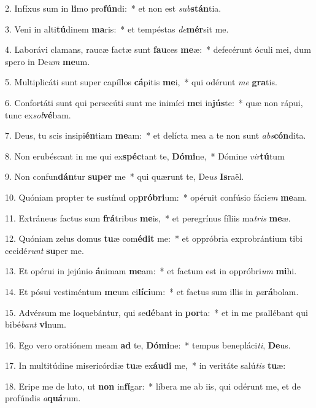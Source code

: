 2. Infíxus sum in \textbf{li}mo pro\textbf{fún}di:~*  et non est \textit{sub}\textbf{stán}tia.\

3. Veni in alti\textbf{tú}dinem \textbf{ma}ris:~*  et tempéstas \textit{de}\textbf{mér}sit me.\

4. Laborávi clamans, raucæ factæ sunt \textbf{fau}ces \textbf{me}æ:~*  defecérunt óculi mei, dum spero in De\textit{um} \textbf{me}um.\

5. Multiplicáti sunt super capíllos \textbf{cá}pitis \textbf{me}i,~*  qui odérunt \textit{me} \textbf{gra}tis.\

6. Confortáti sunt qui persecúti sunt me inimíci \textbf{me}i in\textbf{jús}te:~*  quæ non rápui, tunc ex\textit{sol}\textbf{vé}bam.\

7. Deus, tu scis insipi\textbf{én}tiam \textbf{me}am:~*  et delícta mea a te non sunt \textit{abs}\textbf{cón}dita.\

8. Non erubéscant in me qui ex\textbf{spéc}tant te, \textbf{Dó}\textbf{mi}ne,~*  Dómine \textit{vir}\textbf{tú}tum\

9. Non confun\textbf{dán}tur \textbf{su}\textbf{per} me~*  qui quærunt te, De\textit{us} \textbf{Is}raël.\

10. Quóniam propter te sustínu\textbf{i} op\textbf{pró}\textbf{bri}um:~*  opéruit confúsio fáci\textit{em} \textbf{me}am.\

11. Extráneus factus sum \textbf{frá}tribus \textbf{me}is,~*  et peregrínus fíliis ma\textit{tris} \textbf{me}æ.\

12. Quóniam zelus domus \textbf{tu}æ com\textbf{é}\textbf{dit} me:~*  et oppróbria exprobrántium tibi cecidé\textit{runt} \textbf{su}per me.\

13. Et opérui in jejúnio \textbf{á}nimam \textbf{me}am:~*  et factum est in oppróbri\textit{um} \textbf{mi}hi.\

14. Et pósui vestiméntum \textbf{me}um ci\textbf{lí}\textbf{ci}um:~*  et factus sum illis in \textit{pa}\textbf{rá}bolam.\

15. Advérsum me loquebántur, qui se\textbf{dé}bant in \textbf{por}ta:~*  et in me psallébant qui bibé\textit{bant} \textbf{vi}num.\

16. Ego vero oratiónem meam \textbf{ad} te, \textbf{Dó}\textbf{mi}ne:~*  tempus benepláci\textit{ti}, \textbf{De}us.\

17. In multitúdine misericórdiæ \textbf{tu}æ ex\textbf{áu}\textbf{di} me,~*  in veritáte salú\textit{tis} \textbf{tu}æ:\

18. Eripe me de luto, ut \textbf{non} in\textbf{fí}gar:~*  líbera me ab iis, qui odérunt me, et de profúndis \textit{a}\textbf{quá}rum.\

